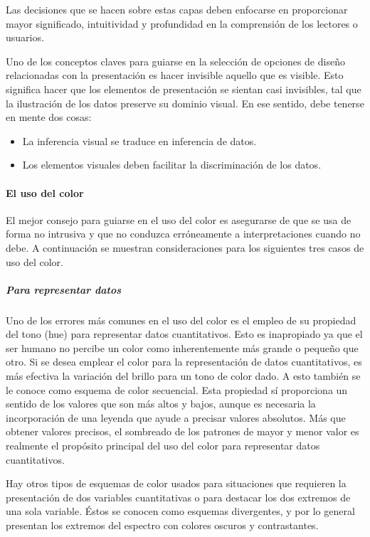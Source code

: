 Las decisiones que se hacen sobre estas capas deben enfocarse en proporcionar mayor significado, intuitividad y profundidad en la comprensión de los lectores o usuarios.

Uno de los conceptos claves para guiarse en la selección de opciones de diseño relacionadas con la presentación es hacer invisible aquello que es visible. Esto significa hacer que los elementos de presentación se sientan casi invisibles, tal que la ilustración de los datos preserve su dominio visual. En ese sentido, debe tenerse en mente dos cosas:

\begin{itemize}
  \item La inferencia visual se traduce en inferencia de datos.
  \item Los elementos visuales deben facilitar la discriminación de los datos.
\end{itemize}

\paragraph{El uso del color}

El mejor consejo para guiarse en el uso del color es asegurarse de que se usa de forma no intrusiva y que no conduzca erróneamente a interpretaciones cuando no debe. A continuación se muestran consideraciones para los siguientes tres casos de uso del color.

\subparagraph{Para representar datos}

Uno de los errores más comunes en el uso del color es el empleo de su propiedad del tono (hue) para representar datos cuantitativos. Esto es inapropiado ya que el ser humano no percibe un color como inherentemente más grande o pequeño que otro. Si se desea emplear el color para la representación de datos cuantitativos, es más efectiva la variación del brillo para un tono de color dado. A esto también se le conoce como esquema de color secuencial. Esta propiedad sí proporciona un sentido de los valores que son más altos y bajos, aunque es necesaria la incorporación de una leyenda que ayude a precisar valores absolutos. Más que obtener valores precisos, el sombreado de los patrones de mayor y menor valor es realmente el propósito principal del uso del color para representar datos cuantitativos.

Hay otros tipos de esquemas de color usados para situaciones que requieren la presentación de dos variables cuantitativas o para destacar los dos extremos de una sola variable. Éstos se conocen como esquemas divergentes, y por lo general presentan los extremos del espectro con colores oscuros y contrastantes.

